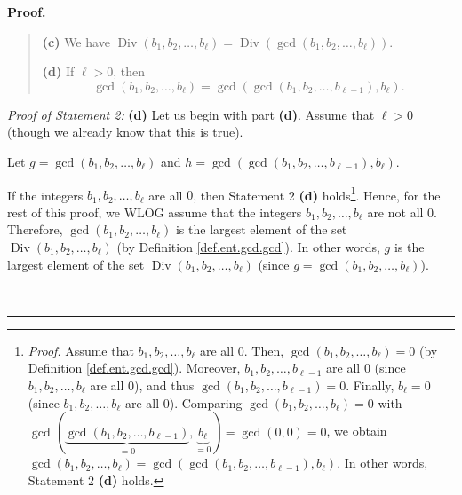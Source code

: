 \documentclass[numbers=enddot,12pt,final,onecolumn,notitlepage]{scrartcl}%
\numberwithin{exer}{subsection}
\theoremstyle{definition}
\newenvironment{statement}{\begin{quote}}{\end{quote}}
\newenvironment{proof}[1][Proof]{\noindent\textbf{#1.} }{\ \rule{0.5em}{0.5em}}
\begin{document}
\begin{proof}
\begin{statement}
\textbf{(c)} We have $\operatorname*{Div}\left(  b_{1},b_{2},\ldots,b_{\ell
}\right)  =\operatorname*{Div}\left(  \gcd\left(  b_{1},b_{2},\ldots,b_{\ell
}\right)  \right)  $.

\textbf{(d)} If $\ell>0$, then%
\[
\gcd\left(  b_{1},b_{2},\ldots,b_{\ell}\right)  =\gcd\left(  \gcd\left(
b_{1},b_{2},\ldots,b_{\ell-1}\right)  ,b_{\ell}\right)  .
\]

\end{statement}

\textit{Proof of Statement 2:} \textbf{(d)} Let us begin with part
\textbf{(d)}. Assume that $\ell>0$ (though we already know that this is true).

Let $g=\gcd\left(  b_{1},b_{2},\ldots,b_{\ell}\right)  $ and $h=\gcd\left(
\gcd\left(  b_{1},b_{2},\ldots,b_{\ell-1}\right)  ,b_{\ell}\right)  $.

If the integers $b_{1},b_{2},\ldots,b_{\ell}$ are all $0$, then Statement 2
\textbf{(d)} holds\footnote{\textit{Proof.} Assume that $b_{1},b_{2}%
,\ldots,b_{\ell}$ are all $0$. Then, $\gcd\left(  b_{1},b_{2},\ldots,b_{\ell
}\right)  =0$ (by Definition \ref{def.ent.gcd.gcd}). Moreover, $b_{1}%
,b_{2},\ldots,b_{\ell-1}$ are all $0$ (since $b_{1},b_{2},\ldots,b_{\ell}$ are
all $0$), and thus $\gcd\left(  b_{1},b_{2},\ldots,b_{\ell-1}\right)  =0$.
Finally, $b_{\ell}=0$ (since $b_{1},b_{2},\ldots,b_{\ell}$ are all $0$).
Comparing $\gcd\left(  b_{1},b_{2},\ldots,b_{\ell}\right)  =0$ with
$\gcd\left(  \underbrace{\gcd\left(  b_{1},b_{2},\ldots,b_{\ell-1}\right)
}_{=0},\underbrace{b_{\ell}}_{=0}\right)  =\gcd\left(  0,0\right)  =0$, we
obtain $\gcd\left(  b_{1},b_{2},\ldots,b_{\ell}\right)  =\gcd\left(
\gcd\left(  b_{1},b_{2},\ldots,b_{\ell-1}\right)  ,b_{\ell}\right)  $. In
other words, Statement 2 \textbf{(d)} holds.}. Hence, for the rest of this
proof, we WLOG assume that the integers $b_{1},b_{2},\ldots,b_{\ell}$ are not
all $0$. Therefore, $\gcd\left(  b_{1},b_{2},\ldots,b_{\ell}\right)  $ is the
largest element of the set $\operatorname*{Div}\left(  b_{1},b_{2}%
,\ldots,b_{\ell}\right)  $ (by Definition \ref{def.ent.gcd.gcd}). In other
words, $g$ is the largest element of the set $\operatorname*{Div}\left(
b_{1},b_{2},\ldots,b_{\ell}\right)  $ (since $g=\gcd\left(  b_{1},b_{2}%
,\ldots,b_{\ell}\right)  $).


\end{proof}
\end{document}
